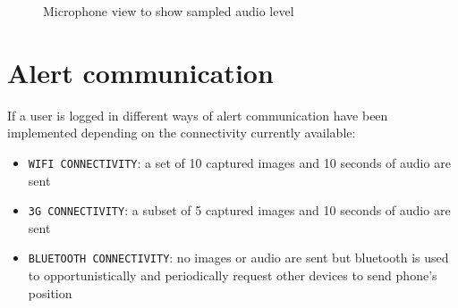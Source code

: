 \documentclass[conference]{IEEEtran}
\begin{document}
\begin{figure}[!ht]
\begin{center}
\caption{Microphone view to show sampled audio level}
\label{img:microphone}
\end{center}
\end{figure}

\section{\textbf{Alert communication}}
If a user is logged in different ways of alert communication have been implemented depending on the connectivity currently available:\\
\begin{itemize}
	\item \texttt{WIFI CONNECTIVITY}: a set of 10 captured images and 10 seconds of audio are sent
	\item \texttt{3G CONNECTIVITY}: a subset of 5 captured images and 10 seconds of audio are sent
	\item \texttt{BLUETOOTH CONNECTIVITY}: no images or audio are sent but bluetooth is used to opportunistically and periodically request other devices to send phone's position
\end{itemize}
\end{document}

